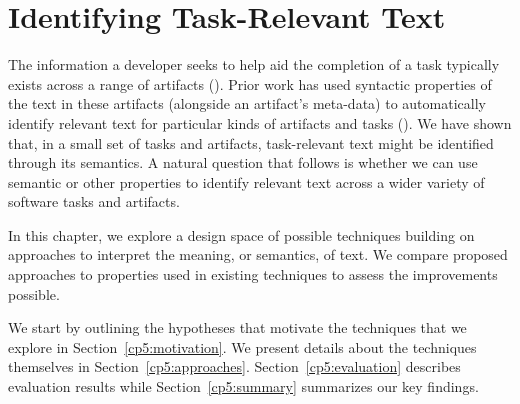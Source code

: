\setcounter{chapter}{4}
\setcounter{rq}{1}


\chapter{Identifying Task-Relevant Text}
\label{ch:identifying}

The information a developer seeks to help aid the completion of a task typically exists
across a range of artifacts (). Prior work has used syntactic properties of the text
in these artifacts (alongside an artifact's meta-data)
to automatically identify relevant text for particular kinds of artifacts and tasks ().
We have  shown that, in a small set of tasks and artifacts, task-relevant text might be identified through its semantics.
A natural question that follows is whether we can use semantic or other properties to identify relevant text across a wider variety of software tasks and artifacts.

In this chapter, we explore a design space of possible techniques building on approaches to
interpret the meaning, or semantics, of text. We compare proposed approaches to properties
used in existing techniques to assess the improvements possible. 

We start by outlining the hypotheses that motivate the techniques that we explore in Section~\ref{cp5:motivation}.
We present details about the techniques themselves in Section~\ref{cp5:approaches}.
Section~\ref{cp5:evaluation} describes evaluation results while
Section~\ref{cp5:summary} summarizes our key findings.
















